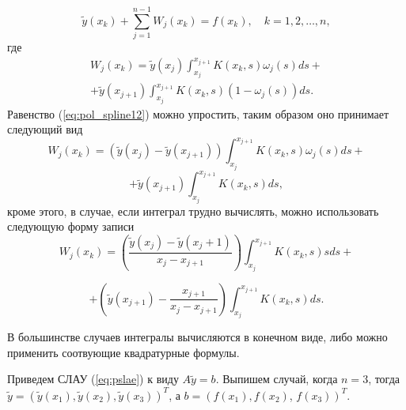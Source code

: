 \documentclass{spisok-article}
\begin{document}
\begin{equation}
\tilde y\left(x_k\right)+\sum_{j=1}^{n-1}W_j\left(x_k\right)=f\left(x_k\right),\quad k=1,2,\dots,n,
\label{eq:pslae}
\end{equation}
где
\begin{equation}
	\begin{gathered}
W_j\left(x_k\right)=\tilde y\left(x_{j}\right)\int_{x_{j}}^{x_{j+1}}K\left(x_k,s\right)\omega_{j}\left(s\right)ds+\\
+\tilde y\left(x_{j+1}\right)\int_{x_{j}}^{x_{j+1}}K\left(x_k,s\right)\left(1-\omega_{j}\left(s\right)\right)ds.
\end{gathered}
	\label{eq:pol_spline12}
\end{equation}
Равенство (\ref{eq:pol_spline12}) можно упростить, таким образом оно принимает следующий вид
$$
W_j\left(x_k\right)=\left(\tilde y\left(x_j\right)-\tilde y\left(x_{j+1}\right)\right)\int_{x_j}^{x_{j+1}} K\left(x_k,s\right)\omega_{j}\left(s\right)ds+
$$
$$
+\tilde y\left(x_{j+1}\right)\int_{x_j}^{x_{j+1}}K\left(x_k,s\right)ds,
$$
кроме этого, в случае, если интеграл трудно вычислять, можно использовать следующую форму записи
$$
W_j\left(x_k\right)=\left(\frac{\tilde y\left(x_j\right)-\tilde{y}\left(x_j+1\right)}{x_j-x_{j+1}}\right)\int_{x_j}^{x_{j+1}}K\left(x_k,s\right)sds+
$$

$$
+\left(\tilde y\left(x_{j+1}\right)-\frac{x_{j+1}}{x_j-x_{j+1}}\right)\int_{x_j}^{x_{j+1}}K\left(x_k,s\right)ds.
$$

В большинстве случаев интегралы вычисляются в конечном виде, либо можно применить соотвующие квадратурные формулы.

Приведем СЛАУ (\ref{eq:pslae}) к виду $A \tilde y=b$. Выпишем случай, когда $n=3$, тогда $\tilde y=\left(\tilde y\left(x_1\right),\tilde y\left(x_2\right),\tilde y\left(x_3\right)\right)^T$, а $b=\left(f\left(x_1\right),f\left(x_2\right)\right.$, $\left.f\left(x_3\right)\right)^T$.
\end{document}
